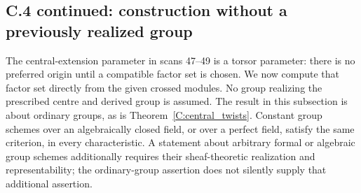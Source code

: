 \subsection{C.4 continued: construction without a previously realized group}

The central-extension parameter in scans 47--49 is a torsor parameter:
there is no preferred origin until a compatible factor set is chosen.
We now compute that factor set directly from the given crossed modules.
No group realizing the prescribed centre and derived group is assumed.
The result in this subsection is about ordinary groups, as is
Theorem~\ref{C:central_twists}.  Constant group schemes over an
algebraically closed field, or over a perfect field, satisfy the same
criterion, in every characteristic.  A statement about arbitrary formal
or algebraic group schemes additionally requires their sheaf-theoretic
realization and representability; the ordinary-group assertion does not
silently supply that additional assertion.

